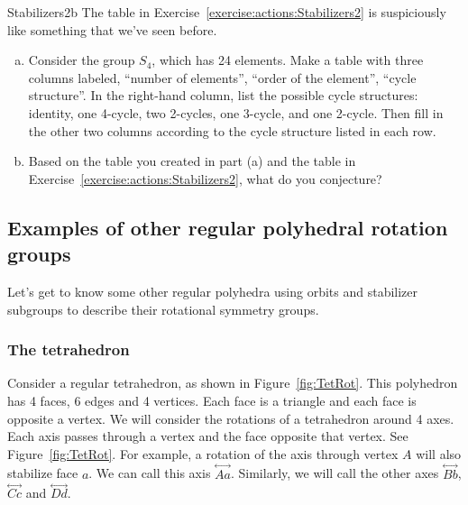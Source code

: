 \begin{exercise}{Stabilizers2b}
The table in Exercise~\ref{exercise:actions:Stabilizers2} is suspiciously like something that we've seen before.
\begin{enumerate}[(a)]
\item
Consider the group $S_4$, which has 24 elements. Make a table with three columns labeled, ``number of elements'', ``order of the element'', ``cycle structure''.  In the right-hand column, list the possible cycle structures: identity, one 4-cycle, two 2-cycles, one 3-cycle, and one 2-cycle. Then fill in the other two columns according to the cycle structure listed in each row.
\item Based on the table you created in part (a) and the table in Exercise~\ref{exercise:actions:Stabilizers2}, what do you conjecture?
\end{enumerate}
\end{exercise}
\subsection{Examples of other regular polyhedral rotation groups}
Let's get to know some other regular polyhedra using orbits and stabilizer subgroups to describe their rotational symmetry groups.
\subsubsection*{The tetrahedron}
Consider a regular tetrahedron, as shown in Figure~\ref {fig:TetRot}. This polyhedron has 4 faces, 6 edges and 4 vertices.  Each face is a triangle and each face is opposite a vertex. We will consider the rotations of a tetrahedron around 4 axes.  Each axis passes through a vertex and the face opposite that vertex. See Figure~\ref {fig:TetRot}. For example, a rotation of the axis through vertex $A$ will also stabilize face $a$.  We can call this axis $\overset{\leftrightarrow}{Aa}$.  Similarly, we will call the other axes $\overset{\leftrightarrow}{Bb}$, $\overset{\leftrightarrow}{Cc}$ and $\overset{\leftrightarrow}{Dd}$.

